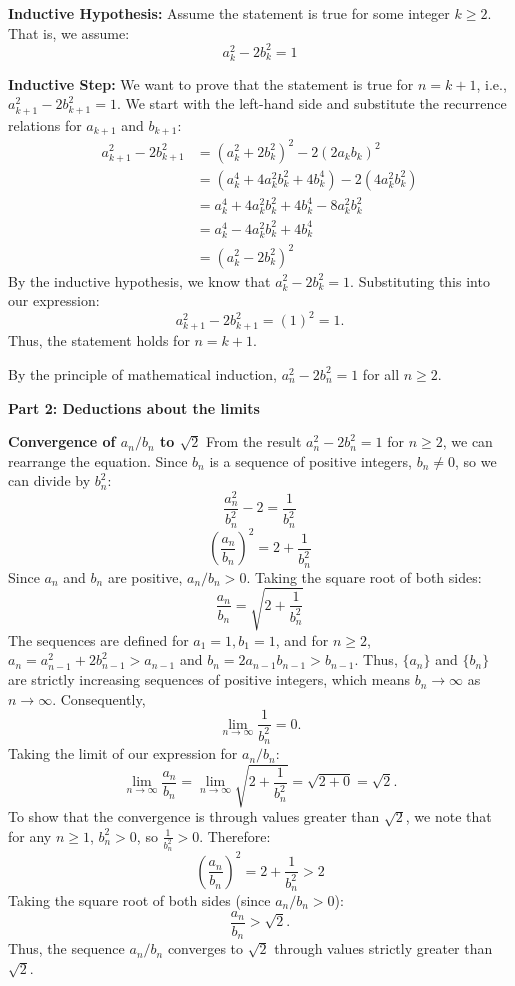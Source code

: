 \textbf{Inductive Hypothesis:}
Assume the statement is true for some integer $k \geq 2$. That is, we assume:
\[ a_k^2 - 2b_k^2 = 1 \]

\textbf{Inductive Step:}
We want to prove that the statement is true for $n=k+1$, i.e., $a_{k+1}^2 - 2b_{k+1}^2 = 1$.
We start with the left-hand side and substitute the recurrence relations for $a_{k+1}$ and $b_{k+1}$:
\begin{align*}
a_{k+1}^2 - 2b_{k+1}^2 &= (a_k^2 + 2b_k^2)^2 - 2(2a_k b_k)^2 \\
&= (a_k^4 + 4a_k^2 b_k^2 + 4b_k^4) - 2(4a_k^2 b_k^2) \\
&= a_k^4 + 4a_k^2 b_k^2 + 4b_k^4 - 8a_k^2 b_k^2 \\
&= a_k^4 - 4a_k^2 b_k^2 + 4b_k^4 \\
&= (a_k^2 - 2b_k^2)^2
\end{align*}
By the inductive hypothesis, we know that $a_k^2 - 2b_k^2 = 1$. Substituting this into our expression:
\[ a_{k+1}^2 - 2b_{k+1}^2 = (1)^2 = 1. \]
Thus, the statement holds for $n=k+1$.

By the principle of mathematical induction, $a_n^2 - 2b_n^2 = 1$ for all $n \geq 2$.

\textbf{Part 2: Deductions about the limits}

\textbf{Convergence of $a_n/b_n$ to $\sqrt{2}$}
From the result $a_n^2 - 2b_n^2 = 1$ for $n \geq 2$, we can rearrange the equation. Since $b_n$ is a sequence of positive integers, $b_n \neq 0$, so we can divide by $b_n^2$:
\[ \frac{a_n^2}{b_n^2} - 2 = \frac{1}{b_n^2} \]
\[ \left(\frac{a_n}{b_n}\right)^2 = 2 + \frac{1}{b_n^2} \]
Since $a_n$ and $b_n$ are positive, $a_n/b_n > 0$. Taking the square root of both sides:
\[ \frac{a_n}{b_n} = \sqrt{2 + \frac{1}{b_n^2}} \]
The sequences are defined for $a_1=1, b_1=1$, and for $n \geq 2$, $a_n = a_{n-1}^2+2b_{n-1}^2 > a_{n-1}$ and $b_n = 2a_{n-1}b_{n-1} > b_{n-1}$. Thus, $\{a_n\}$ and $\{b_n\}$ are strictly increasing sequences of positive integers, which means $b_n \to \infty$ as $n \to \infty$.
Consequently,
\[ \lim_{n \to \infty} \frac{1}{b_n^2} = 0. \]
Taking the limit of our expression for $a_n/b_n$:
\[ \lim_{n \to \infty} \frac{a_n}{b_n} = \lim_{n \to \infty} \sqrt{2 + \frac{1}{b_n^2}} = \sqrt{2+0} = \sqrt{2}. \]
To show that the convergence is through values greater than $\sqrt{2}$, we note that for any $n \geq 1$, $b_n^2 > 0$, so $\frac{1}{b_n^2} > 0$. Therefore:
\[ \left(\frac{a_n}{b_n}\right)^2 = 2 + \frac{1}{b_n^2} > 2 \]
Taking the square root of both sides (since $a_n/b_n > 0$):
\[ \frac{a_n}{b_n} > \sqrt{2}. \]
Thus, the sequence $a_n/b_n$ converges to $\sqrt{2}$ through values strictly greater than $\sqrt{2}$.

